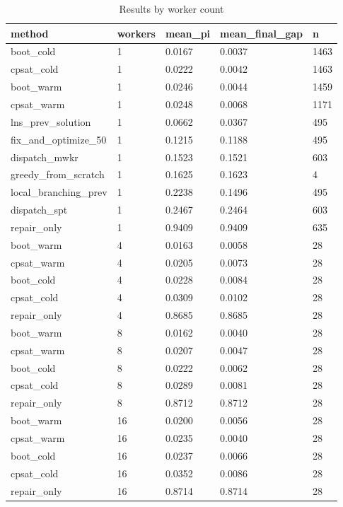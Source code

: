\begin{table}[t]
\centering
\begin{tabular}{lllll}
\toprule
method & workers & mean\_pi & mean\_final\_gap & n \\
\midrule
boot\_cold & 1 & 0.0167 & 0.0037 & 1463 \\
cpsat\_cold & 1 & 0.0222 & 0.0042 & 1463 \\
boot\_warm & 1 & 0.0246 & 0.0044 & 1459 \\
cpsat\_warm & 1 & 0.0248 & 0.0068 & 1171 \\
lns\_prev\_solution & 1 & 0.0662 & 0.0367 & 495 \\
fix\_and\_optimize\_50 & 1 & 0.1215 & 0.1188 & 495 \\
dispatch\_mwkr & 1 & 0.1523 & 0.1521 & 603 \\
greedy\_from\_scratch & 1 & 0.1625 & 0.1623 & 4 \\
local\_branching\_prev & 1 & 0.2238 & 0.1496 & 495 \\
dispatch\_spt & 1 & 0.2467 & 0.2464 & 603 \\
repair\_only & 1 & 0.9409 & 0.9409 & 635 \\
boot\_warm & 4 & 0.0163 & 0.0058 & 28 \\
cpsat\_warm & 4 & 0.0205 & 0.0073 & 28 \\
boot\_cold & 4 & 0.0228 & 0.0084 & 28 \\
cpsat\_cold & 4 & 0.0309 & 0.0102 & 28 \\
repair\_only & 4 & 0.8685 & 0.8685 & 28 \\
boot\_warm & 8 & 0.0162 & 0.0040 & 28 \\
cpsat\_warm & 8 & 0.0207 & 0.0047 & 28 \\
boot\_cold & 8 & 0.0222 & 0.0062 & 28 \\
cpsat\_cold & 8 & 0.0289 & 0.0081 & 28 \\
repair\_only & 8 & 0.8712 & 0.8712 & 28 \\
boot\_warm & 16 & 0.0200 & 0.0056 & 28 \\
cpsat\_warm & 16 & 0.0235 & 0.0040 & 28 \\
boot\_cold & 16 & 0.0237 & 0.0066 & 28 \\
cpsat\_cold & 16 & 0.0352 & 0.0086 & 28 \\
repair\_only & 16 & 0.8714 & 0.8714 & 28 \\
\bottomrule
\end{tabular}
\caption{Results by worker count}
\label{tab:by-workers}
\end{table}
